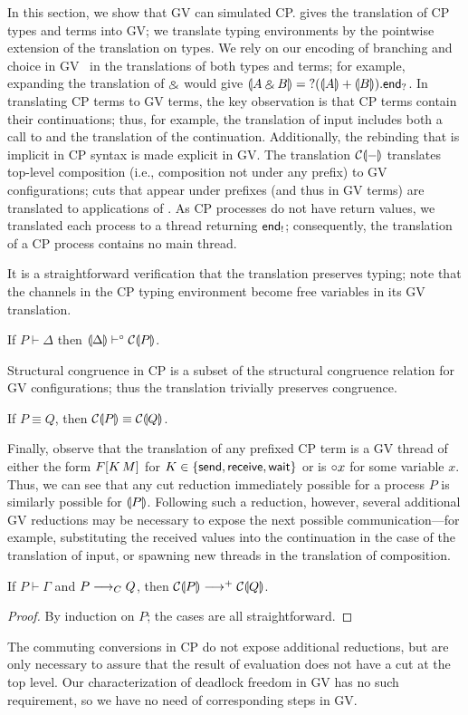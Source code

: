 \documentclass[oribibl,orivec,envcountsame]{llncs}
\begin{document}
In this section, we show that GV can simulated CP.  gives the translation of CP
types and terms into GV; we translate typing environments by the pointwise extension of the
translation on types. We rely on our encoding of branching and choice in GV~ in
the translations of both types and terms; for example, expanding the translation of $\mathbin\binampersand$ would
give $\llparenthesis A \mathbin\binampersand B \rrparenthesis = {?(\llparenthesis A \rrparenthesis + \llparenthesis B \rrparenthesis).\mathsf{end}_?}$. In translating CP terms to GV
terms, the key observation is that CP terms contain their continuations; thus, for example, the
translation of input includes both a call to  and the translation of the
continuation.  Additionally, the rebinding that is implicit in CP syntax is made explicit in GV.
The translation $\mathcal{C}\llparenthesis - \rrparenthesis$ translates top-level composition (i.e., composition not under any
prefix) to GV configurations; cuts that appear under prefixes (and thus in GV terms) are translated
to applications of .  As CP processes do not have return values, we translated each
process to a thread returning $\mathsf{end}_!$; consequently, the translation of a CP process contains no
main thread.

It is a straightforward verification that the translation preserves typing; note that the channels
in the CP typing environment become free variables in its GV translation.
%
\begin{theorem}
If $P \vdash \Delta$ then $\llparenthesis \Delta \rrparenthesis \vdash^{\mathord{\circ}} \mathcal{C}\llparenthesis P \rrparenthesis$.
\end{theorem}
%
Structural congruence in CP is a subset of the structural congruence relation for GV configurations;
thus the translation trivially preserves congruence.
%
\begin{theorem}
If $P \equiv Q$, then $\mathcal{C}\llparenthesis P \rrparenthesis \equiv \mathcal{C}\llparenthesis Q \rrparenthesis$.
\end{theorem}
%
Finally, observe that the translation of any prefixed CP term is a GV thread of either the form $F[K
\, M]$ for $K \in \{ \mathsf{send}, \mathsf{receive}, \mathsf{wait} \}$ or is ${\mathord{\circ}} x$ for
some variable $x$.  Thus, we can see that any cut reduction immediately possible for a process $P$
is similarly possible for $\llparenthesis P \rrparenthesis$.  Following such a reduction, however, several additional GV
reductions may be necessary to expose the next possible communication---for example, substituting
the received values into the continuation in the case of the translation of input, or spawning new
threads in the translation of composition.
%
\begin{theorem}\label{thm:cp-reduction-simulated}
If $P \vdash \Gamma$ and $P \longrightarrow_C Q$, then $\mathcal{C}\llparenthesis P \rrparenthesis \longrightarrow^+ \mathcal{C}\llparenthesis Q \rrparenthesis$.
\end{theorem}
%
\begin{proof}
  By induction on $P$; the cases are all straightforward.
\end{proof}
%
The commuting conversions in CP do not expose additional reductions, but are only necessary to
assure that the result of evaluation does not have a cut at the top level.  Our characterization of
deadlock freedom in GV has no such requirement, so we have no need of corresponding steps in GV.
\end{document}
